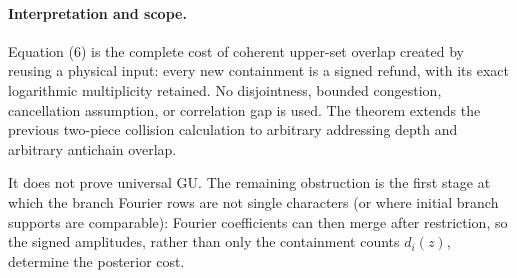 \paragraph{Interpretation and scope.}
Equation (6) is the complete cost of coherent upper-set overlap created
by reusing a physical input: every new containment is a signed refund,
with its exact logarithmic multiplicity retained.  No disjointness,
bounded congestion, cancellation assumption, or correlation gap is
used.  The theorem extends the previous two-piece collision calculation
to arbitrary addressing depth and arbitrary antichain overlap.

It does not prove universal GU.  The remaining obstruction is the first
stage at which the branch Fourier rows are not single characters (or
where initial branch supports are comparable): Fourier coefficients can
then merge after restriction, so the signed amplitudes, rather than only
the containment counts $d_i(z)$, determine the posterior cost.
